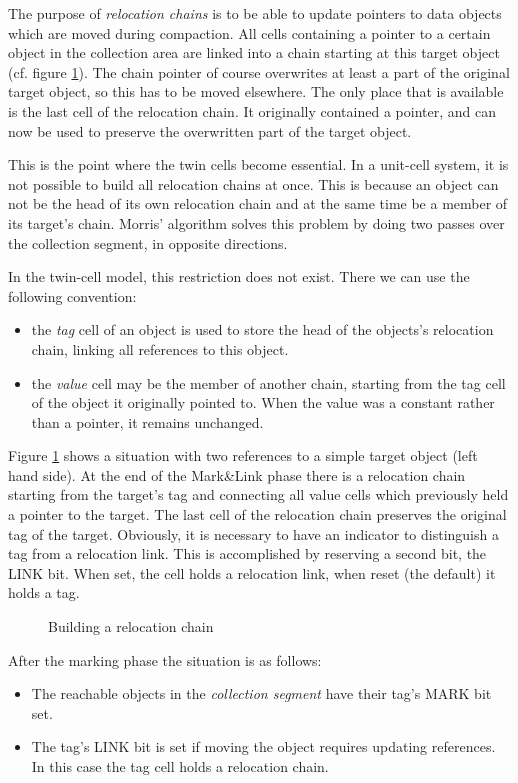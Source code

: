 The purpose of {\em relocation chains} is to be able to update pointers
to data objects which are moved during compaction.
All cells containing a pointer to a certain object in the collection area
are linked into a chain starting at this target object (cf. figure \ref{relch}).
The chain pointer of course overwrites at least a part of the original
target object, so this has to be moved elsewhere.
The only place that is available
is the last cell of the relocation chain. It originally contained a pointer, and
can now be used to preserve the overwritten part of the target object.

This is the point where the twin cells become essential.
In a unit-cell system, it is not possible to build all relocation
chains at once. This is because an object can not be the head of its
own relocation chain and at the same time be a member of its target's
chain. Morris' algorithm \cite{morris} solves this problem by
doing two passes over the
collection segment, in opposite directions.

In the twin-cell model, this restriction does
not exist. There we can use the following convention:
\begin{itemize}
\item the {\em tag} cell of an object is used to store the head of the
objects's relocation chain, linking all references to this object.
\item the {\em value} cell may be the member of another chain, starting
from the tag cell of the object it originally pointed to.
When the value was a constant rather than a
pointer, it remains unchanged.
\end{itemize}
Figure \ref{relch} shows a situation with two references to a simple
target object (left hand side).
At the end of the Mark\&Link phase there is a relocation chain
starting from the target's tag and connecting all value cells
which previously held a pointer to the target.
The last cell of the relocation chain preserves the original tag
of the target.
Obviously, it is necessary to have an indicator to distinguish
a tag from a relocation link.
This is accomplished by reserving a second bit, the LINK bit.
When set, the cell holds a relocation link, when reset (the
default) it holds a tag.

\begin{figure}
\caption{Building a relocation chain}
\label{relch}
\end{figure}

After the marking phase the situation is as follows:
\begin{itemize}
\item The reachable objects in the {\em collection segment} have
their tag's MARK bit set.
\item The tag's LINK bit is set if moving the object requires updating references.
In this case the tag cell holds a relocation chain.
\end{itemize}

